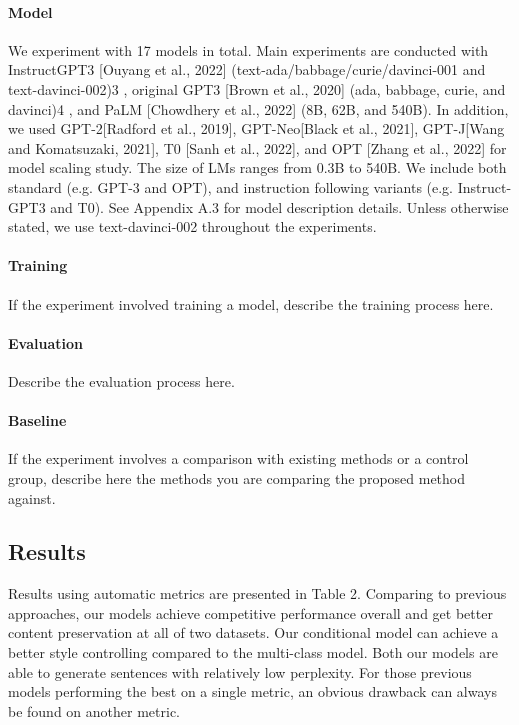 \documentclass{article}
\begin{document}
\paragraph{Model}
We experiment with 17 models in total. Main experiments are conducted with InstructGPT3 [Ouyang et al., 2022] (text-ada/babbage/curie/davinci-001 and text-davinci-002)3 , original GPT3 [Brown et al., 2020] (ada, babbage, curie, and davinci)4 , and PaLM [Chowdhery et al., 2022] (8B, 62B, and 540B). In addition, we used GPT-2[Radford et al., 2019], GPT-Neo[Black et al., 2021], GPT-J[Wang and Komatsuzaki, 2021], T0 [Sanh et al., 2022], and OPT [Zhang et al., 2022] for model scaling study. The size of LMs ranges from 0.3B to 540B. We include both standard (e.g. GPT-3 and OPT), and instruction following variants (e.g. Instruct-GPT3 and T0). See Appendix A.3 for model description details. Unless otherwise stated, we use text-davinci-002 throughout the experiments.

\paragraph{Training}
If the experiment involved training a model, describe the training process here.

\paragraph{Evaluation}
Describe the evaluation process here.

\paragraph{Baseline}
If the experiment involves a comparison with existing methods or a control group, describe here the methods you are comparing the proposed method against.

\subsection{Results}
Results using automatic metrics are presented in Table 2. Comparing to previous approaches, our models achieve competitive performance overall and get better content preservation at all of two datasets. Our conditional model can achieve a better style controlling compared to the multi-class model. Both our models are able to generate sentences with relatively low perplexity. For those previous models performing the best on a single metric, an obvious drawback can always be found on another metric.
\end{document}
